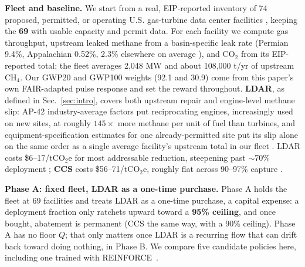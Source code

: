 \documentclass{article}
\begin{document}
\textbf{Fleet and baseline.} We start from a real, EIP-reported inventory
of 74 proposed, permitted, or operating U.S. gas-turbine data center
facilities \cite{eip2026powerbehindai}, keeping the \textbf{69} with
usable capacity and permit data. For each facility we compute gas
throughput, upstream leaked methane from a basin-specific leak rate
(Permian 9.4\%, Appalachian 0.52\%, 2.3\% elsewhere on average
\cite{chen2022permian,ami2025appalachian,alvarez2018methane}), and
CO$_2$ from its EIP-reported total; the fleet averages 2{,}048 MW and
about 108,000 t/yr of upstream CH$_4$. Our GWP20 and GWP100 weights
(92.1 and 30.9) come from this paper's own FAIR-adapted pulse response
and set the reward throughout. \textbf{LDAR}, as defined in
Sec.~\ref{sec:intro}, covers both upstream repair and engine-level
methane slip: AP-42 industry-average factors put reciprocating engines,
increasingly used on new sites, at roughly $145\times$ more methane per
unit of fuel than turbines, and equipment-specification estimates for
one already-permitted site put its slip alone on the same order as a
single average facility's upstream total in our fleet
\cite{epa1996ap42,wvdep2026pointpleasant}. LDAR costs \$6--17/tCO$_2$e
for most addressable reduction, steepening past $\sim$70\% deployment
\cite{icf2014methane,iea2025methanetracker,aldy2025methaneabatement};
\textbf{CCS} costs \$56--71/tCO$_2$e, roughly flat across 90--97\%
capture \cite{rubinzhai2012ccs,netl2023ngcc}.

\textbf{Phase A: fixed fleet, LDAR as a one-time purchase.} Phase A holds
the fleet at 69 facilities and treats LDAR as a one-time purchase, a
capital expense: a deployment fraction only ratchets upward toward a
\textbf{95\% ceiling}, and once bought, abatement is permanent (CCS the
same way, with a 90\% ceiling). Phase A has no floor $Q$; that only
matters once LDAR is a recurring flow that can drift back toward doing
nothing, in Phase B. We compare five candidate policies here, including
one trained with REINFORCE~\cite{williams1992reinforce}.
\end{document}
